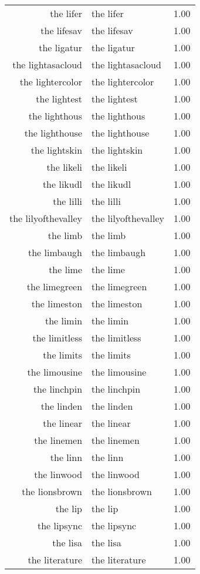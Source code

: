 \begin{table}[ht]
\begin{tabular}{rlr}
  the lifer & the lifer & 1.00 \\ 
  the lifesav & the lifesav & 1.00 \\ 
  the ligatur & the ligatur & 1.00 \\ 
  the lightasacloud & the lightasacloud & 1.00 \\ 
  the lightercolor & the lightercolor & 1.00 \\ 
  the lightest & the lightest & 1.00 \\ 
  the lighthous & the lighthous & 1.00 \\ 
  the lighthouse & the lighthouse & 1.00 \\ 
  the lightskin & the lightskin & 1.00 \\ 
  the likeli & the likeli & 1.00 \\ 
  the likudl & the likudl & 1.00 \\ 
  the lilli & the lilli & 1.00 \\ 
  the lilyofthevalley & the lilyofthevalley & 1.00 \\ 
  the limb & the limb & 1.00 \\ 
  the limbaugh & the limbaugh & 1.00 \\ 
  the lime & the lime & 1.00 \\ 
  the limegreen & the limegreen & 1.00 \\ 
  the limeston & the limeston & 1.00 \\ 
  the limin & the limin & 1.00 \\ 
  the limitless & the limitless & 1.00 \\ 
  the limits & the limits & 1.00 \\ 
  the limousine & the limousine & 1.00 \\ 
  the linchpin & the linchpin & 1.00 \\ 
  the linden & the linden & 1.00 \\ 
  the linear & the linear & 1.00 \\ 
  the linemen & the linemen & 1.00 \\ 
  the linn & the linn & 1.00 \\ 
  the linwood & the linwood & 1.00 \\ 
  the lionsbrown & the lionsbrown & 1.00 \\ 
  the lip & the lip & 1.00 \\ 
  the lipsync & the lipsync & 1.00 \\ 
  the lisa & the lisa & 1.00 \\ 
  the literature & the literature & 1.00 \\ 

\end{tabular}
\end{table}
